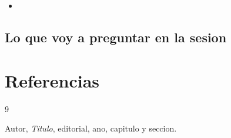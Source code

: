 \documentclass[11pt,letterpaper]{article}
\begin{document}
\begin{itemize}
  \item
\end{itemize}

\subsection*{Lo que voy a preguntar en la sesion}

\section{Referencias}

\begin{thebibliography}{9}

  Autor, \textit{Titulo}, editorial, ano, capitulo y seccion.

\end{thebibliography}
\end{document}

